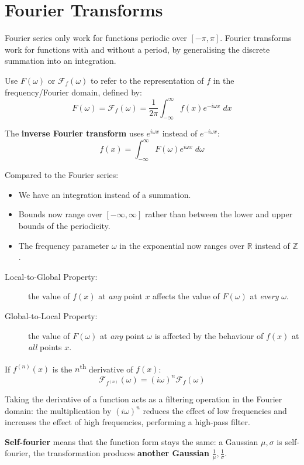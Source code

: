 \documentclass[a4paper, 11pt]{article}
\begin{document}
\section*{Fourier Transforms}
{
    Fourier series only work for functions periodic over \([-\pi,\pi]\). Fourier transforms work for functions with and without a period, by generalising the discrete summation into an integration. 

    Use \(F(\omega)\) or \(\mathcal{F}_f(\omega)\) to refer to the representation of \(f\) in the frequency/Fourier domain, defined by:
    \[F(\omega) = \mathcal{F}_f(\omega) = \frac{1}{2\pi}\int_{-\infty}^\infty{f(x)e^{-i\omega x}\;dx}\]

    The \textbf{inverse Fourier transform} uses \(e^{i\omega x}\) instead of \(e^{-i\omega x}\):
    \[f(x) = \int_{-\infty}^\infty{F(\omega)e^{i\omega x}\;d\omega}\]

    Compared to the Fourier series:
    \begin{itemize}
    \item We have an integration instead of a summation.
    \item Bounds now range over \([-\infty,\infty]\) rather than between the lower and upper bounds of the periodicity.
    \item The frequency parameter \(\omega\) in the exponential now ranges over \(\mathbb{R}\) instead of \(\mathbb{Z}\).
    \end{itemize}

    \begin{description}
    \item[Local-to-Global Property:] the value of \(f(x)\) at \textit{any} point \(x\) affects the value of \(F(\omega)\) at \textit{every} \(\omega\).
    \item[Global-to-Local Property:] the value of \(F(\omega)\) at \textit{any} point \(\omega\) is affected by the behaviour of \(f(x)\) at \textit{all} points \(x\).
    \end{description}

    If \(f^{(n)}(x)\) is the \(n\)\textsuperscript{th} derivative of \(f(x)\):
    \[\mathcal{F}_{f^{(n)}}(\omega) = (i\omega)^n \mathcal{F}_f(\omega)\]

    Taking the derivative of a function acts as a filtering operation in the Fourier domain: the multiplication by \((i\omega)^n\) reduces the effect of low frequencies and increases the effect of high frequencies, performing a high-pass filter.

    \textbf{Self-fourier} means that the function form stays the same: a Gaussian \(\mu, \sigma\) is self-fourier, the transformation produces \textbf{another Gaussian} \(\frac{1}{\mu},\frac{1}{\sigma}\).

}
\end{document}
